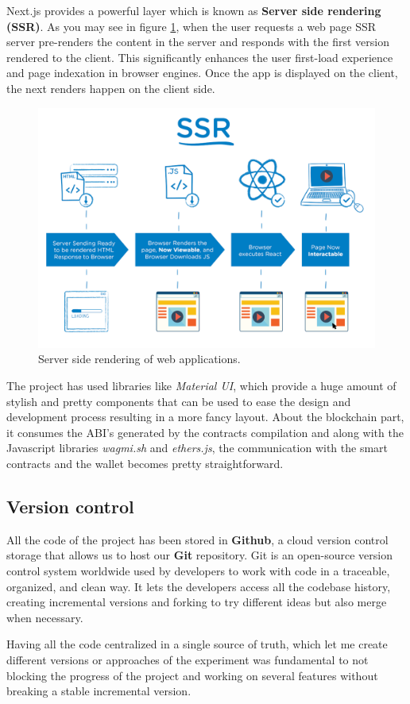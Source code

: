 {Next.js provides a powerful layer which is known as \textbf{Server side rendering (SSR)}. As you may see in figure \ref{fig:ssr}, when the user requests a web page SSR server pre-renders the content in the server and responds with the first version rendered to the client. This significantly enhances the user first-load experience and page indexation in browser engines. Once the app is displayed on the client, the next renders happen on the client side. 

\begin{figure}[H]
\centering
\includegraphics[width=14cm]{img/project-development/ssr.png}
\caption[Server side rendering of web applications]{\footnotesize{Server side rendering of web applications.}}
\label{fig:ssr}
\end{figure}

The project has used libraries like \textit{Material UI}\cite{mui}, which provide a huge amount of stylish and pretty components that can be used to ease the design and development process resulting in a more fancy layout. About the blockchain part, it consumes the ABI's generated by the contracts compilation and along with the Javascript libraries \textit{wagmi.sh} and \textit{ethers.js}\cite{ethers}, the communication with the smart contracts and the wallet becomes pretty straightforward.
}


\subsection{Version control}
{
All the code of the project has been stored in \textbf{Github}\cite{github}, a cloud version control storage that allows us to host our \textbf{Git} repository. Git\cite{git} is an open-source version control system worldwide used by developers to work with code in a traceable, organized, and clean way. It lets the developers access all the codebase history, creating incremental versions and forking to try different ideas but also merge when necessary.

Having all the code centralized in a single source of truth, which let me create different versions or approaches of the experiment was fundamental to not blocking the progress of the project and working on several features without breaking a stable incremental version.
}